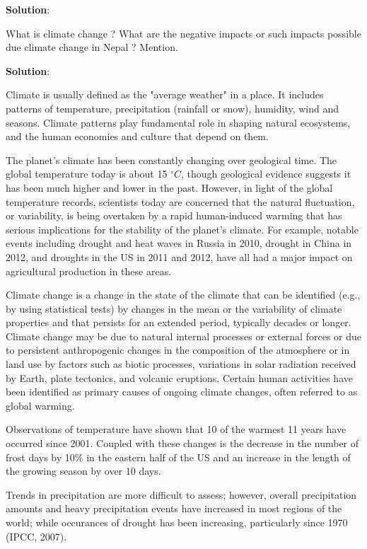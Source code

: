 \documentclass[
  openany]{book}
\newcommand{\question}{\item}
\newenvironment{solution}{ {\bfseries Solution}:}{}
\begin{document}
\begin{questions}
\begin{solution}
\begin{itemize}
\end{itemize}
\end{solution}

\question What is climate change ? What are the negative impacts or such impacts possible due climate change in Nepal ? Mention.

\begin{solution}

Climate is usually defined as the "average weather" in a place. It includes patterns of temperature, precipitation (rainfall or snow), humidity, wind and seasons. Climate patterns play fundamental role in shaping natural ecosystems, and the human economies and culture that depend on them.

The planet's climate has been constantly changing over geological time. The global temperature today is about 15 $^\circ C$, though geological evidence suggests it has been much higher and lower in the past. However, in light of the global temperature records, scientists today are concerned that the natural fluctuation, or variability, is being overtaken by a rapid human-induced warming that has serious implications for the stability of the planet's climate. For example, notable events including drought and heat waves in Russia in 2010, drought in China in 2012, and droughts in the US in 2011 and 2012, have all had a major impact on agricultural production in these areas.

Climate change is a change in the state of the climate that can be identified (e.g., by using statistical tests) by changes in the mean or the variability of climate properties and that persists for an extended period, typically decades or longer. Climate change may be due to natural internal processes or external forces or due to persistent anthropogenic changes in the composition of the atmosphere or in land use by factors such as biotic processes, variations in solar radiation received by Earth, plate tectonics, and volcanic eruptions. Certain human activities have been identified as primary causes of ongoing climate changes, often referred to as global warming.

Observations of temperature have shown that 10 of the warmest 11 years have occurred since 2001. Coupled with these changes is the decrease in the number of frost days by 10\% in the eastern half of the US and an increase in the length of the growing season by over 10 days.

Trends in precipitation are more difficult to assess; however, overall precipitation amounts and heavy precipitation events have increased in most regions of the world; while occurances of drought has been increasing, particularly since 1970 (IPCC, 2007). 


\end{solution}
\end{questions}
\end{document}
